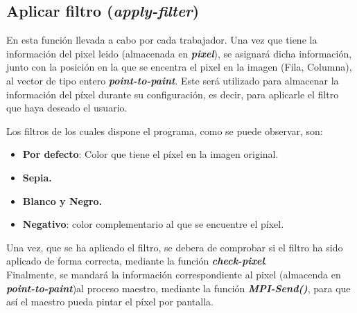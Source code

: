 \documentclass[11pt]{article}
\newif\ifspanish %
\begin{document}



\subsection{Aplicar filtro (\textit{apply-filter})}
En esta función llevada a cabo por cada trabajador. Una vez que tiene la información del pixel leido (almacenada en \textbf{\textit{pixel}}), se asignará dicha información, junto con la posición en la que se encentra el pixel en la imagen (Fila, Columna), al vector de tipo entero \textit{\textbf{point-to-paint}}. Este será utilizado para almacenar la información del píxel durante su configuración, es decir, para aplicarle el filtro que haya deseado el usuario.

Los filtros de los cuales dispone el programa, como se puede observar, son:
\begin{itemize}
	\item \textbf{Por defecto}: Color que tiene el píxel en la imagen original.
	\item \textbf{Sepia.}
	\item \textbf{Blanco y Negro.}
	\item \textbf{Negativo}: color complementario al que se encuentre el píxel.
\end{itemize}

Una vez, que se ha aplicado el filtro, se debera de comprobar si el filtro ha sido aplicado de forma correcta, mediante la función \textit{\textbf{check-pixel}}.\\
Finalmente, se mandará la información correspondiente al pixel (almacenda en \textit{\textbf{point-to-paint}})al proceso maestro, mediante la función \textbf{\textit{MPI-Send()}}, para que así el maestro pueda pintar el píxel por pantalla.




\newpage




\ifspanish
	\addcontentsline{toc}{section}{Referencias}
\else
\fi
\end{document}
